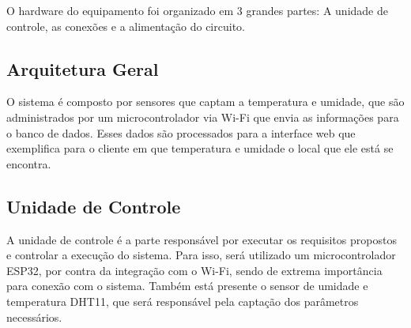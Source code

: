 O hardware do equipamento foi organizado em 3 grandes partes: A unidade de controle, as conexões e a alimentação do circuito.

\subsection{Arquitetura Geral}


O sistema é composto por sensores que captam a temperatura e umidade, que são administrados por um microcontrolador via Wi-Fi que envia as informações para o banco de dados. Esses dados são processados para a interface web que exemplifica para o cliente em que temperatura e umidade o local que ele está se encontra.

\subsection{Unidade de Controle}

A unidade de controle é a parte responsável por executar os requisitos propostos e controlar a execução do sistema. Para isso, será utilizado um microcontrolador ESP32, por contra da integração com o Wi-Fi, sendo de extrema importância para conexão com o sistema. Também está presente o sensor de umidade e temperatura DHT11, que será responsável pela captação dos parâmetros necessários.

